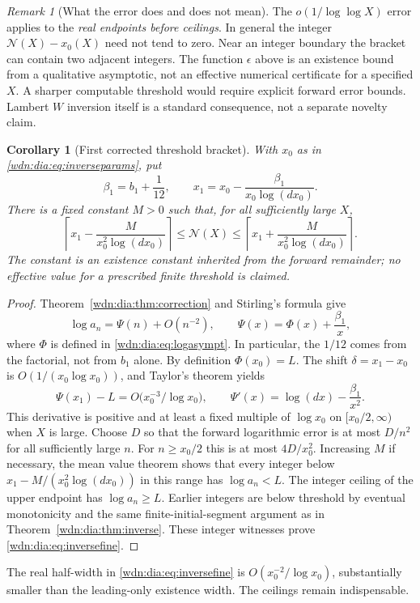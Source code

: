 \documentclass[11pt,letterpaper]{article}
\newtheorem{corollary}[theorem]{Corollary}
\theoremstyle{remark}\newtheorem{remark}[theorem]{Remark}
\begin{document}
\begin{remark}[What the error does and does not mean]\label{wdn:dia:rem:inverse}
The $o(1/\log\log X)$ error applies to the \emph{real endpoints before
ceilings}. In general the integer $\mathcal N(X)-x_0(X)$ need not tend to
zero. Near an integer boundary the bracket can contain two adjacent integers.
The function $\epsilon$ above is an existence bound from a qualitative
asymptotic, not an effective numerical certificate for a specified $X$.
A sharper computable threshold would require explicit forward error bounds.
Lambert $W$ inversion itself is a standard consequence, not a separate
novelty claim.
\end{remark}

\begin{corollary}[First corrected threshold bracket]\label{wdn:dia:cor:inversefine}
With $x_0$ as in \eqref{wdn:dia:eq:inverseparams}, put
\begin{equation}\label{wdn:dia:eq:x1}
 \beta_1=b_1+\frac1{12},\qquad
 x_1=x_0-\frac{\beta_1}{x_0\log(dx_0)}.
\end{equation}
There is a fixed constant $M>0$ such that, for all sufficiently large $X$,
\begin{equation}\label{wdn:dia:eq:inversefine}
 \left\lceil x_1-\frac{M}{x_0^2\log(dx_0)}\right\rceil
 \le\mathcal N(X)\le
 \left\lceil x_1+\frac{M}{x_0^2\log(dx_0)}\right\rceil.
\end{equation}
The constant is an existence constant inherited from the forward remainder;
no effective value for a prescribed finite threshold is claimed.
\end{corollary}
\begin{proof}
Theorem~\ref{wdn:dia:thm:correction} and Stirling's formula give
\[
 \log a_n=\Psi(n)+O(n^{-2}),\qquad
 \Psi(x)=\Phi(x)+\frac{\beta_1}{x},
\]
where $\Phi$ is defined in \eqref{wdn:dia:eq:logasympt}. In particular, the $1/12$
comes from the factorial, not from $b_1$ alone. By definition
$\Phi(x_0)=L$. The shift $\delta=x_1-x_0$ is
$O(1/(x_0\log x_0))$, and Taylor's theorem yields
\[
 \Psi(x_1)-L=O\bigl(x_0^{-3}/\log x_0\bigr),\qquad
 \Psi'(x)=\log(dx)-\frac{\beta_1}{x^2}.
\]
This derivative is positive and at least a fixed multiple of $\log x_0$
on $[x_0/2,\infty)$ when $X$ is large. Choose $D$ so that the forward
logarithmic error is at most $D/n^2$ for all sufficiently large $n$.
For $n\ge x_0/2$ this is at most $4D/x_0^2$. Increasing $M$ if necessary,
the mean value theorem shows that every integer below
$x_1-M/(x_0^2\log(dx_0))$ in this range has $\log a_n<L$.
The integer ceiling of the upper endpoint has $\log a_n\ge L$.
Earlier integers are below threshold by eventual monotonicity and the
same finite-initial-segment argument as in Theorem~\ref{wdn:dia:thm:inverse}.
These integer witnesses prove \eqref{wdn:dia:eq:inversefine}.
\end{proof}
The real half-width in \eqref{wdn:dia:eq:inversefine} is
$O(x_0^{-2}/\log x_0)$, substantially smaller than the leading-only
existence width. The ceilings remain indispensable.
\end{document}
